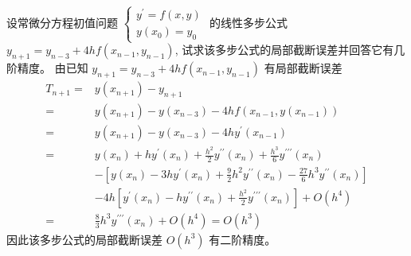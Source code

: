 \begin{tcolorbox}[enhanced,colback=8,colframe=7,breakable,coltitle=green!25!black,title=2024]
 设常微分方程初值问题
$
\left\{\begin{array}{l}
y^{\prime}=f(x, y) \\
y\left(x_{0}\right)=y_{0}
\end{array}\right.
$
的线性多步公式 $ y_{n+1}=y_{n-3}+4 h f\left(x_{n-1}, y_{n-1}\right) $, 试求该多步公式的局部截断误差并回答它有几阶精度。
\tcblower
 由已知 $ y_{n+1}=y_{n-3}+4 h f\left(x_{n-1}, y_{n-1}\right) $ 有局部截断误差
$$
\begin{aligned}
T_{n+1}= & y\left(x_{n+1}\right)-y_{n+1} \\
= & y\left(x_{n+1}\right)-y\left(x_{n-3}\right)-4 h f\left(x_{n-1}, y\left(x_{n-1}\right)\right) \\
= & y\left(x_{n+1}\right)-y\left(x_{n-3}\right)-4 h y^{\prime}\left(x_{n-1}\right) \\
= & y\left(x_{n}\right)+h y^{\prime}\left(x_{n}\right)+\frac{h^{2}}{2} y^{\prime \prime}\left(x_{n}\right)+\frac{h^{3}}{6} y^{\prime \prime \prime}\left(x_{n}\right) \\
& -\left[y\left(x_{n}\right)-3 h y^{\prime}\left(x_{n}\right)+\frac{9}{2} h^{2} y^{\prime \prime}\left(x_{n}\right)-\frac{27}{6} h^{3} y^{\prime \prime}\left(x_{n}\right)\right] \\
& -4 h\left[y^{\prime}\left(x_{n}\right)-h y^{\prime \prime}\left(x_{n}\right)+\frac{h^{2}}{2} y^{\prime \prime \prime}\left(x_{n}\right)\right]+O\left(h^{4}\right) \\
= & \frac{8}{3} h^{3} y^{\prime \prime \prime}\left(x_{n}\right)+O\left(h^{4}\right)=O\left(h^{3}\right)
\end{aligned}
$$
因此该多步公式的局部截断误差 $ O\left(h^{3}\right) $ 有二阶精度。
 \end{tcolorbox}

